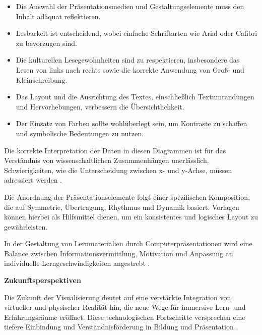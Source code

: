 \begin{itemize}
	\item Die Auswahl der Präsentationsmedien und Gestaltungselemente muss den Inhalt adäquat reflektieren.
	\item Lesbarkeit ist entscheidend, wobei einfache Schriftarten wie Arial oder Calibri zu bevorzugen sind.
	\item Die kulturellen Lesegewohnheiten sind zu respektieren, insbesondere das Lesen von links nach rechts sowie die korrekte Anwendung von Groß- und Kleinschreibung.
	\item Das Layout und die Ausrichtung des Textes, einschließlich Textumrandungen und Hervorhebungen, verbessern die Übersichtlichkeit.
	\item Der Einsatz von Farben sollte wohlüberlegt sein, um Kontraste zu schaffen und symbolische Bedeutungen zu nutzen.
\end{itemize}

Die korrekte Interpretation der Daten in diesen Diagrammen ist für das Verständnis von wissenschaftlichen Zusammenhängen unerlässlich. Schwierigkeiten, wie die Unterscheidung zwischen x- und y-Achse, müssen adressiert werden \cite{Happonen2011}.

Die Anordnung der Präsentationselemente folgt einer spezifischen Komposition, die auf Symmetrie, Übertragung, Rhythmus und Dynamik basiert. Vorlagen können hierbei als Hilfsmittel dienen, um ein konsistentes und logisches Layout zu gewährleisten.

In der Gestaltung von Lernmaterialien durch Computerpräsentationen wird eine Balance zwischen Informationsvermittlung, Motivation und Anpassung an individuelle Lerngeschwindigkeiten angestrebt \cite{Vermirovsky2010}.

\textbf{Zukunftsperspektiven}

Die Zukunft der Visualisierung deutet auf eine verstärkte Integration von virtueller und physischer Realität hin, die neue Wege für immersive Lern- und Erfahrungsräume eröffnet. Diese technologischen Fortschritte versprechen eine tiefere Einbindung und Verständnisförderung in Bildung und Präsentation \cite{Vermirovsky2010ImportanceVisualisation}.



